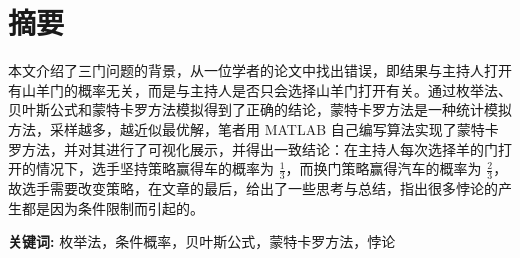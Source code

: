 \section*{ \centering 摘要}

\vskip0.5cm
本文介绍了三门问题的背景，从一位学者的论文中找出错误，即结果与主持人打开有山羊门的概率无关，而是与主持人是否只会选择山羊门打开有关。通过枚举法、贝叶斯公式和蒙特卡罗方法模拟得到了正确的结论，蒙特卡罗方法是一种统计模拟方法，采样越多，越近似最优解，笔者用 MATLAB 自己编写算法实现了蒙特卡罗方法，并对其进行了可视化展示，并得出一致结论：在主持人每次选择羊的门打开的情况下，选手坚持策略赢得车的概率为 $\frac{1}{3}$，而换门策略赢得汽车的概率为 $\frac{2}{3}$，故选手需要改变策略，在文章的最后，给出了一些思考与总结，指出很多悖论的产生都是因为条件限制而引起的。

\textbf{关键词:}  枚举法，条件概率，贝叶斯公式，蒙特卡罗方法，悖论 







